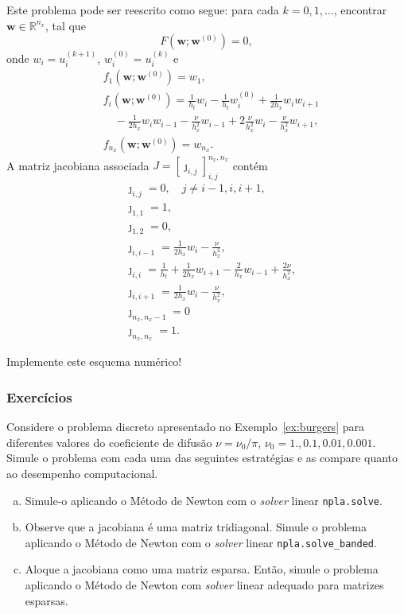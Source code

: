 \begin{ex}
  Este problema pode ser reescrito como segue: para cada $k = 0, 1, \ldots$, encontrar $\pmb{w}\in\mathbb{R}^{n_x}$, tal que
  \begin{equation}
    F\left(\pmb{w}; \pmb{w}^{(0)}\right) = 0, 
  \end{equation}
  onde $w_{i} = u^{(k+1)}_i$, $w_{i}^{(0)} = u^{(k)}_{i}$ e
  \begin{align}
    & f_1\left(\pmb{w}; \pmb{w}^{(0)}\right) = w_1,\\
    & f_{i}\left(\pmb{w}; \pmb{w}^{(0)}\right) = \frac{1}{h_t}w_i - \frac{1}{h_t}w^{(0)}_i + \frac{1}{2h_x}w_iw_{i+1} \nonumber\\
    &\quad - \frac{1}{2h_x}w_iw_{i-1} - \frac{\nu}{h_x^2}w_{i-1} + 2\frac{\nu}{h_x^2}w_i - \frac{\nu}{h_x^2}w_{i+1},\\
    &f_{n_x}\left(\pmb{w}; \pmb{w}^{(0)}\right) = w_{n_x}.
  \end{align}
  A matriz jacobiana associada $J=[\jmath_{i,j}]_{i,j}^{n_x,n_x}$ contém
  \begin{align}
    & \jmath_{i,j} = 0,\quad j\neq i-1,i,i+1,\\
    & \jmath_{1,1} = 1,\\
    & \jmath_{1,2} = 0,\\
    & \jmath_{i,i-1} = \frac{1}{2h_x}w_i - \frac{\nu}{h_x^2},\\
    & \jmath_{i,i} = \frac{1}{h_t} + \frac{1}{2h_x}w_{i+1} - \frac{2}{h_x}w_{i-1} + \frac{2\nu}{h_x^2},\\
    & \jmath_{i,i+1} = \frac{1}{2h_x}w_{i} - \frac{\nu}{h_x^2},\\
    & \jmath_{n_x,n_x-1} = 0\\
    & \jmath_{n_x,n_x} = 1.
  \end{align}

  Implemente este esquema numérico!
\end{ex}

\subsubsection{Exercícios}
\badgeRevisar

\begin{exer}\label{cap_otimizacao_sec_sisnlin:exer:burgers}
  Considere o problema discreto apresentado no Exemplo~\ref{ex:burgers} para diferentes valores do coeficiente de difusão $\nu = \nu_0/\pi$, $\nu_0 = 1., 0.1, 0.01, 0.001$. Simule o problema com cada uma das seguintes estratégias e as compare quanto ao desempenho computacional.
  \begin{enumerate}[a)]
  \item Simule-o aplicando o Método de Newton com o {\it solver} linear \lstinline+npla.solve+.
  \item Observe que a jacobiana é uma matriz tridiagonal. Simule o problema aplicando o Método de Newton com o {\it solver} linear \lstinline+npla.solve_banded+.
  \item Aloque a jacobiana como uma matriz esparsa. Então, simule o problema aplicando o Método de Newton com {\it solver} linear adequado para matrizes esparsas.
  \end{enumerate}
\end{exer}

